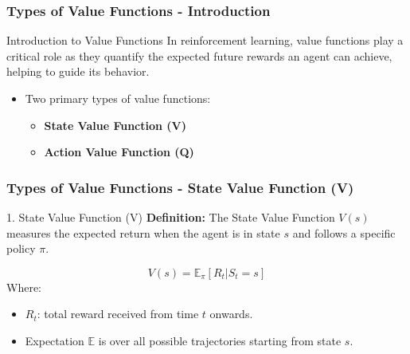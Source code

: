 \documentclass[aspectratio=169]{beamer}
\begin{document}
\begin{frame}[fragile]
    \frametitle{Types of Value Functions - Introduction}
    \begin{block}{Introduction to Value Functions}
        In reinforcement learning, value functions play a critical role as they quantify the expected future rewards an agent can achieve, helping to guide its behavior. 
    \end{block}
    \begin{itemize}
        \item Two primary types of value functions: 
        \begin{itemize}
            \item \textbf{State Value Function (V)}
            \item \textbf{Action Value Function (Q)}
        \end{itemize}
    \end{itemize}
\end{frame}

\begin{frame}[fragile]
    \frametitle{Types of Value Functions - State Value Function (V)}
    \begin{block}{1. State Value Function (V)}
        \textbf{Definition:} The State Value Function \( V(s) \) measures the expected return when the agent is in state \( s \) and follows a specific policy \( \pi \).
    \end{block}
    \begin{equation}
        V(s) = \mathbb{E}_{\pi}[R_t | S_t = s]
    \end{equation}
    Where:
    \begin{itemize}
        \item \( R_t \): total reward received from time \( t \) onwards.
        \item Expectation \( \mathbb{E} \) is over all possible trajectories starting from state \( s \).
    \end{itemize}
\end{frame}
\end{document}
